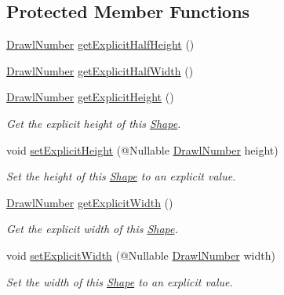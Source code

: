 \subsection*{Protected Member Functions}
\begin{DoxyCompactItemize}
\item 
\hyperlink{classcom_1_1aarrelaakso_1_1drawl_1_1_drawl_number}{Drawl\+Number} \hyperlink{classcom_1_1aarrelaakso_1_1drawl_1_1_shape_a7207aa8ba07ed18af81fb9d92a979cd6}{get\+Explicit\+Half\+Height} ()
\item 
\hyperlink{classcom_1_1aarrelaakso_1_1drawl_1_1_drawl_number}{Drawl\+Number} \hyperlink{classcom_1_1aarrelaakso_1_1drawl_1_1_shape_af952f32cb1706da71c9cb75916f4d665}{get\+Explicit\+Half\+Width} ()
\item 
\hyperlink{classcom_1_1aarrelaakso_1_1drawl_1_1_drawl_number}{Drawl\+Number} \hyperlink{classcom_1_1aarrelaakso_1_1drawl_1_1_shape_a76cd6b4d9f427f1888fc98fd653ee496}{get\+Explicit\+Height} ()
\begin{DoxyCompactList}\small\item\em Get the explicit height of this \hyperlink{classcom_1_1aarrelaakso_1_1drawl_1_1_shape}{Shape}. \end{DoxyCompactList}\item 
void \hyperlink{classcom_1_1aarrelaakso_1_1drawl_1_1_shape_ad3881ca048d83262948961f9f0ab23e3}{set\+Explicit\+Height} (@Nullable \hyperlink{classcom_1_1aarrelaakso_1_1drawl_1_1_drawl_number}{Drawl\+Number} height)
\begin{DoxyCompactList}\small\item\em Set the height of this \hyperlink{classcom_1_1aarrelaakso_1_1drawl_1_1_shape}{Shape} to an explicit value. \end{DoxyCompactList}\item 
\hyperlink{classcom_1_1aarrelaakso_1_1drawl_1_1_drawl_number}{Drawl\+Number} \hyperlink{classcom_1_1aarrelaakso_1_1drawl_1_1_shape_aabb6ac3a04620e1c760bcea54797cba8}{get\+Explicit\+Width} ()
\begin{DoxyCompactList}\small\item\em Get the explicit width of this \hyperlink{classcom_1_1aarrelaakso_1_1drawl_1_1_shape}{Shape}. \end{DoxyCompactList}\item 
void \hyperlink{classcom_1_1aarrelaakso_1_1drawl_1_1_shape_a71f8f1c75ff6eb7f2c4b4d80c80a665a}{set\+Explicit\+Width} (@Nullable \hyperlink{classcom_1_1aarrelaakso_1_1drawl_1_1_drawl_number}{Drawl\+Number} width)
\begin{DoxyCompactList}\small\item\em Set the width of this \hyperlink{classcom_1_1aarrelaakso_1_1drawl_1_1_shape}{Shape} to an explicit value. \end{DoxyCompactList}\item 

\end{DoxyCompactItemize}
